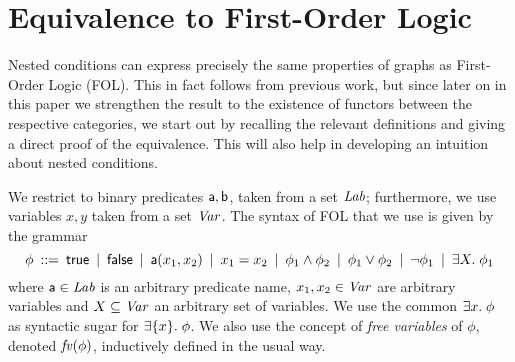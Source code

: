 \section{Equivalence to First-Order Logic}

Nested conditions can express precisely the same properties of graphs as First-Order Logic (FOL). This in fact follows from previous work, but since later on in this paper we strengthen the result to the existence of functors between the respective categories, we start out by recalling the relevant definitions and giving a direct proof of the equivalence. This will also help in developing an intuition about nested conditions.

We restrict to binary predicates $\mathsf{a},\mathsf{b}$, taken from a set $\mathit{Lab}$; furthermore, we use variables $x,y$ taken from a set $\mathit{Var}$. The syntax of FOL that we use is given by the grammar
%
\[ \phi \:::=\: \mathsf{true}
        \:\mid\: \mathsf{false}
		\:\mid\: \mathsf{a}(x_1,x_2)
        \:\mid\: x_1=x_2
		\:\mid\: \phi_1\wedge \phi_2
		\:\mid\: \phi_1\vee \phi_2
		\:\mid\: \neg\phi_1
		\:\mid\: \exists X.\; \phi_1 
		\]
where $\mathsf{a}\in\mathit{Lab}$ is an arbitrary predicate name, $x_1,x_2\in\mathit{Var}$ are arbitrary variables and $X\subseteq \mathit{Var}$ an arbitrary set of variables. We use the common $\exists x.\; \phi$ as syntactic sugar for $\exists\{{x}\}.\; \phi$. We also use the concept of \emph{free variables} of $\phi$, denoted $\mathit{fv}(\phi)$, inductively defined in the usual way.

